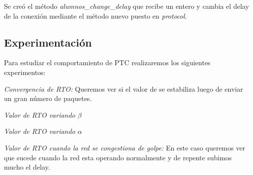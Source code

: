     Se cre\'o el m\'etodo \textit{alumnos\_change\_delay} que recibe un
    entero y cambia el delay de la conexi\'on mediante el m\'etodo nuevo
    puesto en \textit{protocol}.
    
  \subsection{Experimentaci\'on}  
    Para estudiar el comportamiento de PTC realizaremos los siguientes
    experimentos:
    
    \emph{Convergencia de RTO:} Queremos ver si el valor de \rto{} se
    estabiliza luego de enviar un gran n\'umero de paquetes.
  
    \emph{Valor de RTO variando $\beta$}
    
    \emph{Valor de RTO variando $\alpha$}
    
    \emph{Valor de RTO cuando la red se congestiona de golpe:} En este
    caso queremos ver que sucede cuando la red esta operando normalmente
    y de repente subimos mucho el delay.
